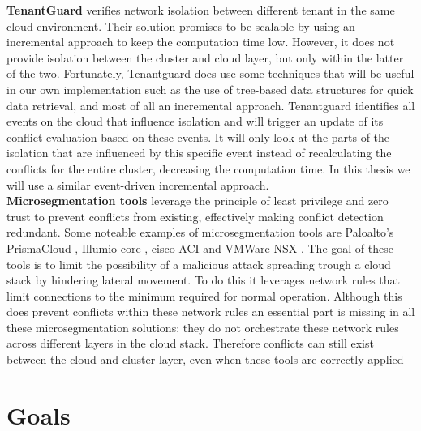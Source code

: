 \textbf{TenantGuard} \cite{tenantguard} verifies network isolation between different tenant in the same cloud environment. Their solution promises to be scalable by using an incremental approach to keep the computation time low. However, it does not provide isolation between the cluster and cloud layer, but only within the latter of the two. Fortunately, Tenantguard does use some techniques that will be useful in our own implementation such as the use of tree-based data structures for quick data retrieval, and most of all an incremental approach. Tenantguard identifies all events on the cloud that influence isolation and will trigger an update of its conflict evaluation based on these events. It will only look at the parts of the isolation that are influenced by this specific event instead of recalculating the conflicts for the entire cluster, decreasing the computation time. In this thesis we will use a similar event-driven incremental approach.
\\[10pt]

\textbf{Microsegmentation tools} leverage the principle of least privilege \cite{leastprivilige} and zero trust \cite{trust} to prevent conflicts from existing, effectively making conflict detection redundant. Some noteable examples of microsegmentation tools are Paloalto's PrismaCloud \cite{prismacloud}, Illumio core \cite{illumio}, cisco ACI \cite{ciscoaci} and VMWare NSX \cite{vmwarensx}. The goal of these tools is to limit the possibility of a malicious attack spreading trough a cloud stack by hindering lateral movement. To do this it leverages network rules that limit connections to the minimum required for normal operation. Although this does prevent conflicts within these network rules an essential part is missing in all these microsegmentation solutions: they do not orchestrate these network rules across different layers in the cloud stack. Therefore conflicts can  still exist between the cloud and cluster layer, even when these tools are correctly applied 

\section{Goals} \label{sec:goals}


